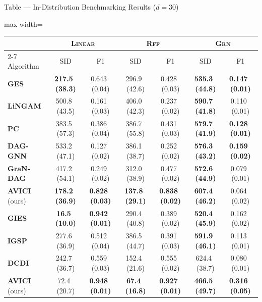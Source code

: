 \documentclass[aspectratio=169,10pt]{beamer}
\newcommand{\err}[1]{\tiny{$\,$(#1)}}
\newcommand{\highlight}[1]{\textbf{#1}}
\newcommand{\domain}[1]{\textsc{#1}}
\newcommand{\ges}{\textbf{GES}}
\newcommand{\pc}{\textbf{PC}}
\newcommand{\lingam}{\textbf{LiNGAM}}
\newcommand{\daggnn}{\textbf{DAG-GNN}}
\newcommand{\grandag}{\textbf{GraN-DAG}}
\newcommand{\oursobserv}{\textbf{AVICI} (ours)}
\newcommand{\gies}{\textbf{GIES}}
\newcommand{\igsp}{\textbf{IGSP}}
\newcommand{\dcdi}{\textbf{DCDI}}
\newcommand{\oursinterv}{\textbf{AVICI} (ours)}
\begin{document}
\begin{frame}{Table --- In-Distribution Benchmarking Results ($d=30$)}
\scriptsize
\begin{adjustbox}{max width=\textwidth}
\begin{tabular}{lcccccc}
\toprule
 &           \multicolumn{2}{c}{\domain{Linear}}            &            \multicolumn{2}{c}{\domain{Rff}}           &        \multicolumn{2}{c}{\domain{Grn}}       \\
\cmidrule{2-7}
Algorithm &              SID &               F1  &              SID &               F1 &              SID &               F1\\
\midrule
\ges         &  \highlight{217.5 \err{38.3}} &              0.643 \err{0.04} &              296.9 \err{42.6} &              0.428 \err{0.03} &  \highlight{535.3 \err{44.8}} &  \highlight{0.147 \err{0.01}} \\
\lingam      &              500.8 \err{43.5} &              0.161 \err{0.03} &              406.0 \err{42.3} &              0.237 \err{0.02} &  \highlight{590.7 \err{41.8}} &              0.110 \err{0.01} \\
\pc          &              383.5 \err{57.3} &              0.386 \err{0.04} &              386.7 \err{55.8} &              0.431 \err{0.03} &  \highlight{579.7 \err{41.9}} &  \highlight{0.128 \err{0.01}} \\
\daggnn      &              533.2 \err{47.1} &              0.127 \err{0.02} &              386.1 \err{38.7} &              0.252 \err{0.02} &  \highlight{576.3 \err{43.2}} &  \highlight{0.159 \err{0.02}} \\
\grandag     &              417.2 \err{54.1} &              0.249 \err{0.02} &              312.0 \err{38.9} &              0.477 \err{0.02} &  \highlight{572.6 \err{44.9}} &              0.079 \err{0.01} \\
\oursobserv &  \highlight{178.2 \err{36.9}} &  \highlight{0.828 \err{0.03}} &  \highlight{137.8 \err{29.1}} &  \highlight{0.838 \err{0.02}} &  \highlight{607.4 \err{46.2}} &              0.064 \err{0.02} \\
\midrule
\gies        &   \highlight{16.5 \err{10.0}} &  \highlight{0.942 \err{0.01}} &              290.4 \err{40.8} &              0.389 \err{0.02} &  \highlight{520.4 \err{45.9}} &              0.162 \err{0.02} \\
\igsp        &              277.6 \err{36.9} &              0.512 \err{0.04} &              386.5 \err{44.7} &              0.391 \err{0.03} &  \highlight{591.9 \err{46.1}} &              0.113 \err{0.01} \\
\dcdi        &              242.7 \err{36.7} &              0.559 \err{0.03} &              152.4 \err{21.6} &              0.555 \err{0.02} &              624.4 \err{38.7} &              0.080 \err{0.01} \\
\oursinterv &               72.4 \err{20.7} &  \highlight{0.948 \err{0.01}} &   \highlight{67.4 \err{16.8}} &  \highlight{0.927 \err{0.01}} &  \highlight{466.5 \err{49.7}} &  \highlight{0.316 \err{0.05}} \\
\bottomrule
\end{tabular}
\end{adjustbox}


\end{frame}
\end{document}
